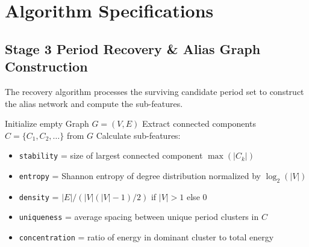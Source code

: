 \section{Algorithm Specifications} \label{sec:app_algorithms}

\subsection{Stage 3 Period Recovery \& Alias Graph Construction} \label{sec:app_alg_spec}
The recovery algorithm processes the surviving candidate period set to construct the alias network and compute the sub-features.

\begin{algorithm}[htbp]
\caption{Stage 3 Period Recovery and Alias Graph Construction\label{alg:stage3}}
Initialize empty Graph $G = (V, E)$\;
Extract connected components $C = \{C_1, C_2, \dots\}$ from $G$\;
Calculate sub-features:
\begin{itemize}
\item \texttt{stability} = size of largest connected component $\max(|C_k|)$\;
\item \texttt{entropy} = Shannon entropy of degree distribution normalized by $\log_2(|V|)$\;
\item \texttt{density} = $|E| / (|V|(|V|-1)/2)$ if $|V| > 1$ else $0$\;
\item \texttt{uniqueness} = average spacing between unique period clusters in $C$\;
\item \texttt{concentration} = ratio of energy in dominant cluster to total energy\;
\end{itemize}
\;
\end{algorithm}

